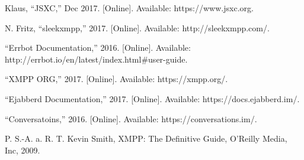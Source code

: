  
\begin{thebibliography}{7}

\bibitem{} Klaus, “JSXC,” Dec 2017. [Online]. Available: https://www.jsxc.org.

\bibitem{} N. Fritz, “sleekxmpp,” 2017. [Online]. Available: http://sleekxmpp.com/.

\bibitem{} “Errbot Documentation,” 2016. [Online]. Available: http://errbot.io/en/latest/index.html\#user-guide.

\bibitem{} “XMPP ORG,” 2017. [Online]. Available: https://xmpp.org/.


\bibitem{} “Ejabberd Documentation,” 2017. [Online]. Available: https://docs.ejabberd.im/.

\bibitem{} “Conversatoins,” 2016. [Online]. Available: https://conversations.im/.

\bibitem{} P. S.-A. a. R. T. Kevin Smith, XMPP: The Definitive Guide, O'Reilly Media, Inc, 2009.
\end{thebibliography}